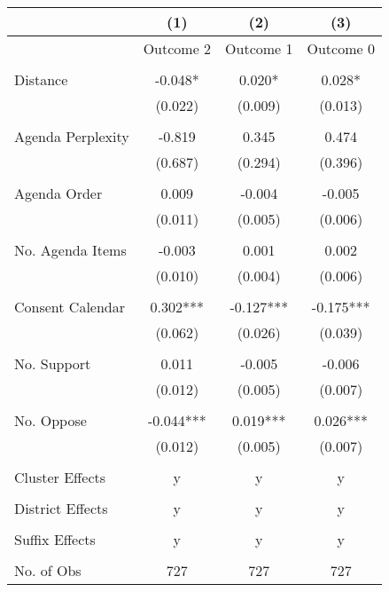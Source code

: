 \begin{tabular}{lccc}
\toprule
                  &       (1) &       (2) &       (3) \\
\midrule
                  & Outcome 2 & Outcome 1 & Outcome 0 \\
                  &           &           &           \\
         Distance &   -0.048* &    0.020* &    0.028* \\
                  &   (0.022) &   (0.009) &   (0.013) \\
                  &           &           &           \\
Agenda Perplexity &    -0.819 &     0.345 &     0.474 \\
                  &   (0.687) &   (0.294) &   (0.396) \\
                  &           &           &           \\
     Agenda Order &     0.009 &    -0.004 &    -0.005 \\
                  &   (0.011) &   (0.005) &   (0.006) \\
                  &           &           &           \\
 No. Agenda Items &    -0.003 &     0.001 &     0.002 \\
                  &   (0.010) &   (0.004) &   (0.006) \\
                  &           &           &           \\
 Consent Calendar &  0.302*** & -0.127*** & -0.175*** \\
                  &   (0.062) &   (0.026) &   (0.039) \\
                  &           &           &           \\
      No. Support &     0.011 &    -0.005 &    -0.006 \\
                  &   (0.012) &   (0.005) &   (0.007) \\
                  &           &           &           \\
       No. Oppose & -0.044*** &  0.019*** &  0.026*** \\
                  &   (0.012) &   (0.005) &   (0.007) \\
                  &           &           &           \\
  Cluster Effects &         y &         y &         y \\
                  &           &           &           \\
 District Effects &         y &         y &         y \\
                  &           &           &           \\
   Suffix Effects &         y &         y &         y \\
                  &           &           &           \\
       No. of Obs &       727 &       727 &       727 \\
\bottomrule
\end{tabular}
